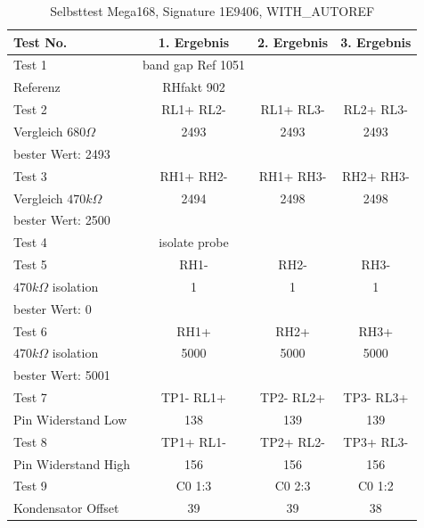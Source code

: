 \begin{table}[H]
  \begin{center}
    \begin{tabular}{| l | c | c | c |}
    \hline
Test No. & 1. Ergebnis & 2. Ergebnis & 3. Ergebnis \\
    \hline
    \hline
Test 1 & band gap Ref  1051 &  & \\
Referenz  & RHfakt 902 &  &  \\
    \hline
Test 2 & RL1+ RL2- & RL1+ RL3- & RL2+ RL3- \\
Vergleich \(680\Omega\) & 2493 & 2493 & 2493 \\
bester Wert: 2493 & & & \\
    \hline
Test 3 & RH1+ RH2- & RH1+ RH3- & RH2+ RH3- \\
Vergleich \(470k\Omega\) & 2494 & 2498 & 2498 \\
bester Wert: 2500 & & & \\
    \hline
Test 4 & isolate probe & & \\
    \hline
Test 5 & RH1- &  RH2- & RH3- \\
\(470k\Omega\) isolation & 1 & 1 & 1 \\
bester Wert: 0 & & & \\
    \hline
Test 6 & RH1+ & RH2+ & RH3+ \\
\(470k\Omega\) isolation & 5000 & 5000 & 5000 \\
bester Wert: 5001 & & & \\
    \hline
Test 7 & TP1- RL1+ & TP2- RL2+ & TP3- RL3+ \\
Pin Widerstand Low & 138 & 139 & 139 \\
    \hline
Test 8 & TP1+ RL1- & TP2+ RL2- & TP3+ RL3- \\
Pin Widerstand High & 156 & 156 & 156 \\
    \hline
Test 9 & C0  1:3 & C0  2:3 & C0 1:2 \\
Kondensator Offset & 39 & 39 & 38 \\
    \hline
    \end{tabular}
  \end{center}
  \caption{Selbsttest Mega168, Signature 1E9406, WITH\_AUTOREF}
  \label{tab:test_m168} 
\end{table}
